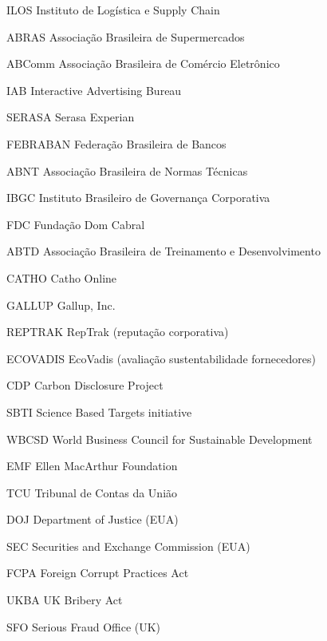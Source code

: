 \begin{siglas}
\item[ILOS] Instituto de Logística e Supply Chain
\item[ABRAS] Associação Brasileira de Supermercados
\item[ABComm] Associação Brasileira de Comércio Eletrônico
\item[IAB] Interactive Advertising Bureau
\item[SERASA] Serasa Experian
\item[FEBRABAN] Federação Brasileira de Bancos
\item[ABNT] Associação Brasileira de Normas Técnicas
\item[IBGC] Instituto Brasileiro de Governança Corporativa
\item[FDC] Fundação Dom Cabral
\item[ABTD] Associação Brasileira de Treinamento e Desenvolvimento
\item[CATHO] Catho Online
\item[GALLUP] Gallup, Inc.
\item[REPTRAK] RepTrak (reputação corporativa)
\item[ECOVADIS] EcoVadis (avaliação sustentabilidade fornecedores)
\item[CDP] Carbon Disclosure Project
\item[SBTI] Science Based Targets initiative
\item[WBCSD] World Business Council for Sustainable Development
\item[EMF] Ellen MacArthur Foundation
\item[TCU] Tribunal de Contas da União
\item[DOJ] Department of Justice (EUA)
\item[SEC] Securities and Exchange Commission (EUA)
\item[FCPA] Foreign Corrupt Practices Act
\item[UKBA] UK Bribery Act
\item[SFO] Serious Fraud Office (UK)
\end{siglas}
